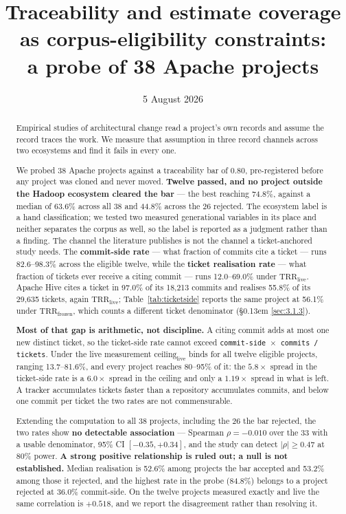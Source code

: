 \documentclass[conference]{IEEEtran}
\title{Traceability and estimate coverage as corpus-eligibility constraints:\\
a probe of 38 Apache projects}
\author{\IEEEauthorblockN{Malek Khannoussi}
\IEEEauthorblockA{Independent Researcher\\
Tunisia\\
khannoussimalek@gmail.com}}
\date{5 August 2026}
\begin{document}
\maketitle


\begin{abstract}

Empirical studies of architectural change read a project's own records and assume the record traces the work. We measure that assumption in three record channels across two ecosystems and find it fails in every one.

We probed 38 Apache projects against a traceability bar of 0.80, pre-registered before any project was cloned and never moved. \textbf{Twelve passed, and no project outside the Hadoop ecosystem cleared the bar} --- the best reaching 74.8\%, against a median of 63.6\% across all 38 and 44.8\% across the 26 rejected. The ecosystem label is a hand classification; we tested two measured generational variables in its place and neither separates the corpus as well, so the label is reported as a judgment rather than a finding. The channel the literature publishes is not the channel a ticket-anchored study needs. The \textbf{commit-side rate} --- what fraction of commits cite a ticket --- runs 82.6--98.3\% across the eligible twelve, while the \textbf{ticket realisation rate} --- what fraction of tickets ever receive a citing commit --- runs 12.0--69.0\% under $\mathrm{TRR}_\mathrm{live}$. Apache Hive cites a ticket in 97.0\% of its 18,213 commits and realises 55.8\% of its 29,635 tickets, again $\mathrm{TRR}_\mathrm{live}$; Table~\ref{tab:ticketside} reports the same project at 56.1\% under $\mathrm{TRR}_\mathrm{frozen}$, which counts a different ticket denominator (\S\kern0.13em \ref{sec:3.1.3}).

\textbf{Most of that gap is arithmetic, not discipline.} A citing commit adds at most one new distinct ticket, so the ticket-side rate cannot exceed \texttt{commit-\allowbreak{}side $\times$ commits /\allowbreak{} tickets}. Under the live measurement $\mathrm{ceiling}_\mathrm{live}$ binds for all twelve eligible projects, ranging 13.7--81.6\%, and every project reaches 80--95\% of it: the $5.8\times$ spread in the ticket-side rate is a $6.0\times$ spread in the ceiling and only a $1.19\times$ spread in what is left. A tracker accumulates tickets faster than a repository accumulates commits, and below one commit per ticket the two rates are not commensurable.

Extending the computation to all 38 projects, including the 26 the bar rejected, the two rates show \textbf{no detectable association} --- Spearman $\rho = -0.010$ over the 33 with a usable denominator, 95\% CI $[-0.35, +0.34]$, and the study can detect $\lvert \rho \rvert \geq 0.47$ at 80\% power. \textbf{A strong positive relationship is ruled out; a null is not established.} Median realisation is 52.6\% among projects the bar accepted and 53.2\% among those it rejected, and the highest rate in the probe (84.8\%) belongs to a project rejected at 36.0\% commit-side. On the twelve projects measured exactly and live the same correlation is \textbf{$+0.518$}, and we report the disagreement rather than resolving it.


\end{abstract}
\end{document}
